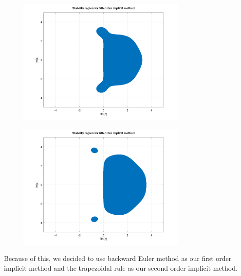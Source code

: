 \documentclass[12pt]{article}
\begin{document}
\begin{figure}[H]
	\centering
	\includegraphics[width=0.75\textwidth]{fifth_order_stab_region.png}
\end{figure}

\begin{figure}[H]
	\centering
	\includegraphics[width=0.75\textwidth]{sixth_order_stab_region.png}
\end{figure}
Because of this, we decided to use backward Euler method as our first order implicit method and the trapezoidal rule as our second order implicit method. 
\end{document}
